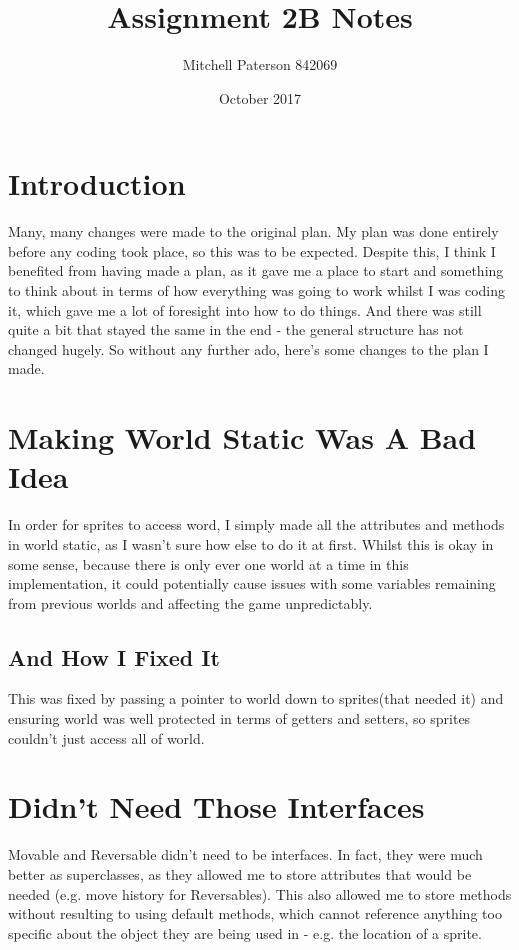 \documentclass{article}
\title{Assignment 2B Notes}
\author{Mitchell Paterson 842069 }
\date{October 2017}
\begin{document}
\maketitle

\section{Introduction}
Many, many changes were made to the original plan. My plan was done entirely before any coding took place, so this was to be expected. Despite this, I think I benefited from having made a plan, as it gave me a place to start and something to think about in terms of how everything was going to work whilst I was coding it, which gave me a lot of foresight into how to do things. And there was still quite a bit that stayed the same in the end - the general structure has not changed hugely. So without any further ado, here's some changes to the plan I made.

\section{Making World Static Was A Bad Idea}
In order for sprites to access word, I simply made all the attributes and methods in world static, as I wasn't sure how else to do it at first. Whilst this is okay in some sense, because there is only ever one world at a time in this implementation, it could potentially cause issues with some variables remaining from previous worlds and affecting the game unpredictably. 
\subsection{And How I Fixed It}This was fixed by passing a pointer to world down to sprites(that needed it) and ensuring world was well protected in terms of getters and setters, so sprites couldn't just access all of world.

\section{Didn't Need Those Interfaces}
Movable and Reversable didn't need to be interfaces. In fact, they were much better as superclasses, as they allowed me to store attributes that would be needed (e.g. move history for Reversables). This also allowed me to store methods without resulting to using default methods, which cannot reference anything too specific about the object they are being used in - e.g. the location of a sprite.
\end{document}
